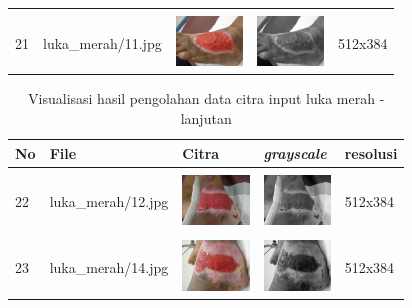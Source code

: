 \begin{table}[H]
\begin{tabular}{|m{0.2in}|m{1.2in}|m{0.7in}|m{0.7in}|m{0.7in}|}
		& &  &  &\\
		21& 
		luka\_merah/11.jpg &
		\includegraphics[width=0.7in]{dataset/dataset_3/luka_merah/ready/11.jpg}&
		\includegraphics[width=0.7in]{dataset/dataset_3/luka_merah/ready/11_gray.jpg}&
		512x384\\
		\hline
	\end{tabular}
\end{table}

\begin{table}[H]
	\centering
	\caption{Visualisasi hasil pengolahan data citra input luka merah - lanjutan}
	\label{tabel_input_11}
	\begin{tabular}{|m{0.2in}|m{1.2in}|m{0.7in}|m{0.7in}|m{0.7in}|}
		\hline
		\textbf{No} & \textbf{File} & \textbf{Citra} & \textbf{\emph{grayscale}} & \textbf{resolusi} \\
		\hline
		
		& &  &  &\\
		22 & 
		luka\_merah/12.jpg &
		\includegraphics[width=0.7in]{dataset/dataset_3/luka_merah/ready/12.jpg}&
		\includegraphics[width=0.7in]{dataset/dataset_3/luka_merah/ready/12_gray.jpg}&
		512x384\\
		\hline
		
		& &  &  &\\
		23& 
		luka\_merah/14.jpg &
		\includegraphics[width=0.7in]{dataset/dataset_3/luka_merah/ready/14.jpg}&
		\includegraphics[width=0.7in]{dataset/dataset_3/luka_merah/ready/14_gray.jpg}&
		512x384\\
		\hline
		

\end{tabular}
\end{table}
